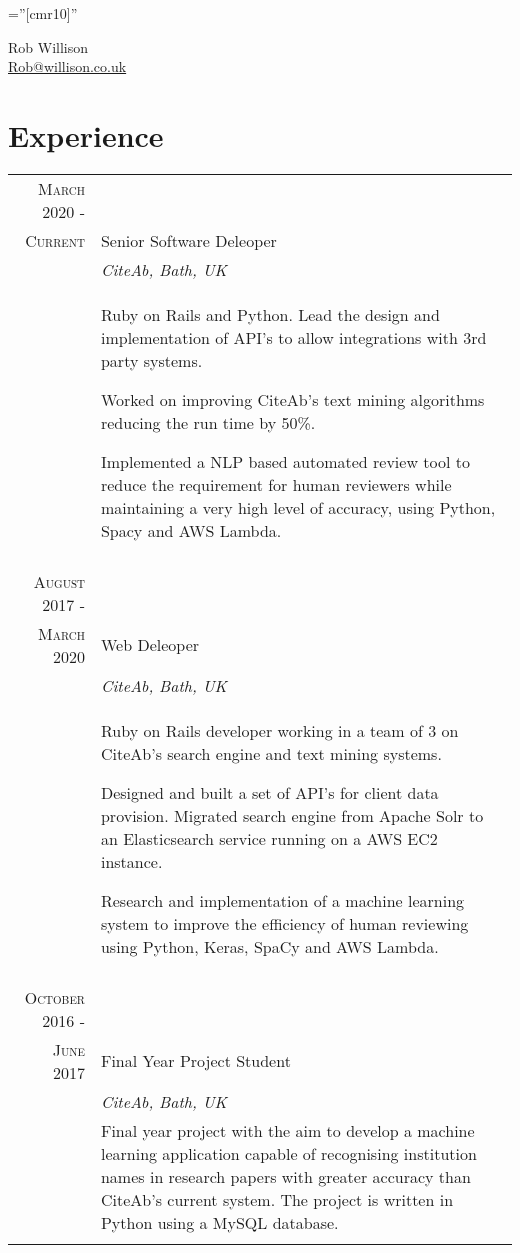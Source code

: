 \documentclass[a4paper,12pt]{article}
\begin{document}
\pagestyle{empty} %

\font\fb=''[cmr10]'' %


\par{\centering
		{\LARGE Rob Willison\\
		\small \href{mailto:Rob@willison.co.uk}{Rob@willison.co.uk
	}\bigskip\par}

\section{Experience}
\begin{tabular}{rp{11cm}}


\textsc{March} 2020 -\\ \textsc{Current} & Senior Software Deleoper
\\&\emph{CiteAb, Bath, UK}\\ &
\footnotesize{Ruby on Rails and Python. Lead the design and implementation of API's
to allow integrations with 3rd party systems.\par
Worked on improving CiteAb's text mining algorithms reducing the run time by 50\%.\par
Implemented a NLP based automated review tool to reduce the requirement for human reviewers while maintaining a very high level of accuracy, using Python, Spacy and AWS Lambda.
}\\\multicolumn{2}{c}{} \\

\textsc{August} 2017 -\\ \textsc{March} 2020 & Web Deleoper
\\&\emph{CiteAb, Bath, UK}\\ &
\footnotesize{Ruby on Rails developer working in a team of 3 on CiteAb's search engine and
text mining systems.\par
Designed and built a set of API's for client data provision.
Migrated search engine from Apache Solr to an Elasticsearch service running on a AWS EC2 instance.\par
Research and implementation of a machine learning system to improve the efficiency of human reviewing using Python, Keras, SpaCy and AWS Lambda.
}\\\multicolumn{2}{c}{} \\

\textsc{October} 2016 -\\ \textsc{June} 2017 & Final Year Project Student
\\&\emph{CiteAb, Bath, UK}\\ &
\footnotesize{Final year project with the aim to develop a machine learning application capable of recognising institution names
 in research papers with greater accuracy than CiteAb's current system. The project is written in Python using a  MySQL database.}\\\multicolumn{2}{c}{} \\


\end{tabular}}
\end{document}

